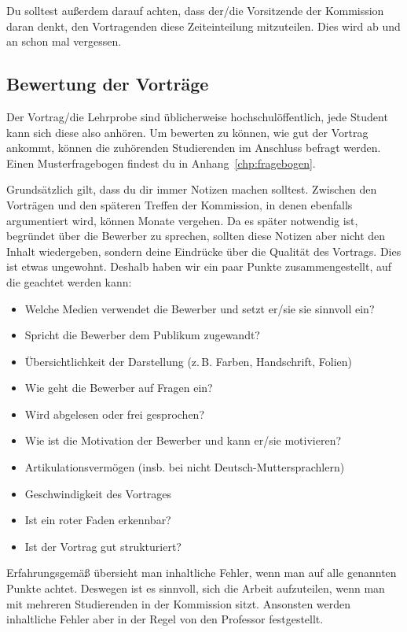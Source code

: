 Du solltest außerdem darauf achten, dass der/die Vorsitzende der Kommission daran denkt, den Vortragenden diese Zeiteinteilung mitzuteilen. Dies wird ab und an schon mal vergessen.

\subsection{Bewertung der Vorträge}
Der Vortrag/die Lehrprobe sind üblicherweise hochschulöffentlich, jede Student kann sich
diese also anhören. Um bewerten zu können, wie gut der Vortrag ankommt, können die zuhörenden Studierenden
im Anschluss befragt werden. Einen Musterfragebogen findest du in Anhang~\ref{chp:fragebogen}.

Grundsätzlich gilt, dass du dir immer Notizen machen solltest. Zwischen den Vorträgen und den späteren Treffen der Kommission, in denen ebenfalls argumentiert wird, können Monate vergehen.
Da es später notwendig ist, begründet über die Bewerber zu sprechen, sollten diese Notizen aber nicht den Inhalt wiedergeben, sondern deine Eindrücke über die Qualität des Vortrags. Dies ist etwas ungewohnt. Deshalb haben wir ein paar Punkte zusammengestellt, auf die geachtet werden kann:
\begin{itemize} %
    \item Welche Medien verwendet die Bewerber und setzt er/sie sie sinnvoll ein?
    \item Spricht die Bewerber dem Publikum zugewandt?
    \item Übersichtlichkeit der Darstellung (z.\,B. Farben, Handschrift, Folien)
    \item Wie geht die Bewerber auf Fragen ein?
    \item Wird abgelesen oder frei gesprochen?
    \item Wie ist die Motivation der Bewerber und kann er/sie motivieren?
    \item Artikulationsvermögen (insb. bei nicht Deutsch-Muttersprachlern)
    \item Geschwindigkeit des Vortrages
    \item Ist ein roter Faden erkennbar?
    \item Ist der Vortrag gut strukturiert?
\end{itemize}
Erfahrungsgemäß übersieht man inhaltliche Fehler, wenn man auf alle genannten Punkte achtet. Deswegen ist es sinnvoll, sich die Arbeit aufzuteilen, wenn man mit mehreren Studierenden in der Kommission sitzt. Ansonsten werden inhaltliche Fehler aber in der Regel von den Professor festgestellt.

